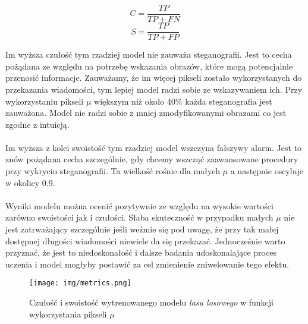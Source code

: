     \begin{equation}
        C = \frac{TP}{TP+FN}
        \label{eq:cul}
    \end{equation}
    \begin{equation}
    S = \frac{TP}{TP+FP}
        \label{eq:swo}
    \end{equation}

    Im wyższa czułość tym rzadziej model nie zauważa steganografii. Jest to cecha pożądana ze względu na potrzebę wskazania obrazów, które mogą potencjalnie przenosić informacje. Zauważamy, że im więcej pikseli zostało wykorzystanych do przekazania wiadomości, tym lepiej model radzi sobie ze wskazywaniem ich. Przy wykorzystaniu pikseli $\mu$ większym niż około 40\% każda steganografia jest zauważona. Model nie radzi sobie z mniej zmodyfikowanymi obrazami co jest zgodne z intuicją. \\
    \\
    Im wyższa z kolei swoistość tym rzadziej model wszczyna fałszywy alarm. Jest to znów pożądana cecha szczególnie, gdy chcemy wszcząć zaawansowane procedury przy wykryciu steganografii. Ta wielkość rośnie dla małych $\mu$ a następnie oscyluje w okolicy 0.9. \\
    \\
    Wyniki modelu można ocenić pozytywnie ze względu na wysokie wartości zarówno swoistości jak i czułości. Słaba skuteczność w przypadku małych $\mu$ nie jest zatrważający szczególnie jeśli weźmie się pod uwagę, że przy tak małej dostępnej długości wiadomości niewiele da się przekazać. Jednocześnie warto przyznać, że jest to niedoskonałość i dalsze badania udoskonalające proces uczenia i model mogłyby postawić za cel zmienienie zniwelowanie tego efektu.

    \begin{figure}[H]
        \centering
        \texttt{[image: img/metrics.png]}
        \caption{Czułość i swoistość wytrenowanego modelu \textit{lasu losowego} w funkcji wykorzystania pikseli $\mu$}
        \label{fig:metrics}
    \end{figure}
